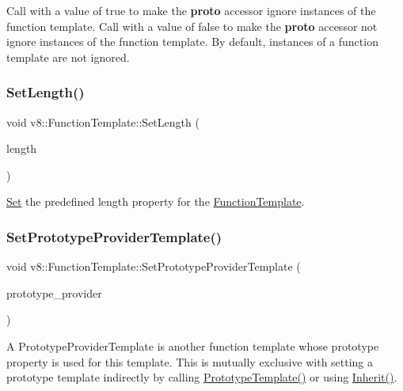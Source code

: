 Call with a value of true to make the {\bfseries proto} accessor ignore instances of the function template. Call with a value of false to make the {\bfseries proto} accessor not ignore instances of the function template. By default, instances of a function template are not ignored. \mbox{\label{classv8_1_1FunctionTemplate_a5faf23b28ee3480b23ce054d0f389a75}} 
\subsubsection{\texorpdfstring{Set\+Length()}{SetLength()}}
{\footnotesize\ttfamily void v8\+::\+Function\+Template\+::\+Set\+Length (\begin{DoxyParamCaption}\item[{int}]{length }\end{DoxyParamCaption})}

\mbox{\hyperlink{classv8_1_1Set}{Set}} the predefined length property for the \mbox{\hyperlink{classv8_1_1FunctionTemplate}{Function\+Template}}. \mbox{\label{classv8_1_1FunctionTemplate_abbe5fd8e3688db6dfb3793f9a48aa372}} 
\subsubsection{\texorpdfstring{Set\+Prototype\+Provider\+Template()}{SetPrototypeProviderTemplate()}}
{\footnotesize\ttfamily void v8\+::\+Function\+Template\+::\+Set\+Prototype\+Provider\+Template (\begin{DoxyParamCaption}\item[{\mbox{\hyperlink{classv8_1_1Local}{Local}}$<$ \mbox{\hyperlink{classv8_1_1FunctionTemplate}{Function\+Template}} $>$}]{prototype\+\_\+provider }\end{DoxyParamCaption})}

A Prototype\+Provider\+Template is another function template whose prototype property is used for this template. This is mutually exclusive with setting a prototype template indirectly by calling \mbox{\hyperlink{classv8_1_1FunctionTemplate_aa2bcc2652b5f0fdbc666d943ccf72021}{Prototype\+Template()}} or using \mbox{\hyperlink{classv8_1_1FunctionTemplate_abc11c462facf11bafd541892815c5425}{Inherit()}}. \mbox{\label{classv8_1_1FunctionTemplate_a007fd05a3fa3c960bf7ddbc05c724d2b}} 
